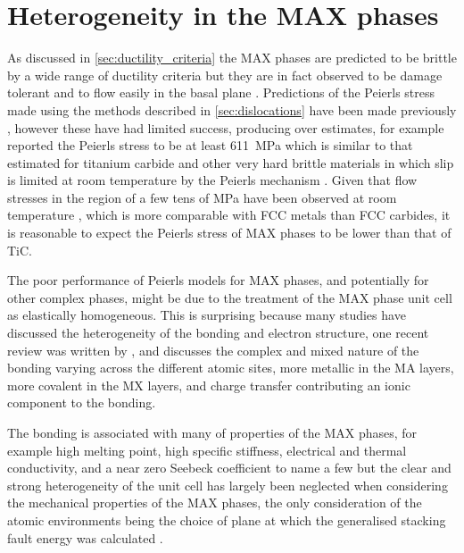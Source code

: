 \chapter{Heterogeneity in the MAX phases}
\label{chap:hetero_max_phases}

\graphicspath{{hetero_max_phases/Figs/}}


As  discussed in \autoref{sec:ductility_criteria} the MAX phases are predicted to be brittle by a wide range of ductility criteria but they are in fact observed to be damage tolerant and to flow easily in the basal plane \cite{Barsoum1999}.
Predictions of the Peierls stress made using the methods described in \autoref{sec:dislocations} have been made previously \cite{Music2007ductility,Gouriet2015}, however these have had limited success, producing over estimates, for example \citet{Gouriet2015} reported the Peierls stress to be at least \SI{611}{\mega\pascal} which is similar to  that estimated for titanium carbide and other very hard brittle materials in which slip is limited at room temperature by the Peierls mechanism \cite{Chang1966,Clegg2006,Kamimura2011,Yadav2014}. Given that flow stresses in the region of a few tens of \si{\mega\pascal} have been observed at room temperature \cite{Humphrey2012,Barsoum1999}, which is more comparable with FCC metals than FCC carbides, it is reasonable to expect the Peierls stress of MAX phases to be lower than that of TiC.

The poor performance of Peierls models for MAX phases, and potentially for other complex phases, might be due to the treatment of the MAX phase unit cell as elastically homogeneous. This is surprising because many studies have discussed the heterogeneity of the bonding and electron structure, one recent review was written by \citet{Magnuson2017}, and discusses the complex and mixed nature of the bonding varying across the different atomic sites, more metallic in the MA layers, more covalent in the MX layers, and charge transfer contributing an ionic component to the bonding. 

The bonding is associated with many of properties of the MAX phases, for example high melting point, high specific stiffness, electrical and thermal conductivity, and a near zero Seebeck coefficient to name a few \cite{Yoo2000,Sun2011,Magnuson2017} but the clear and strong heterogeneity of the unit cell has largely been neglected when considering the mechanical properties of the MAX phases, the only consideration of the atomic environments  being the choice of plane at which the generalised stacking fault energy was calculated \cite{Music2007ductility}.


